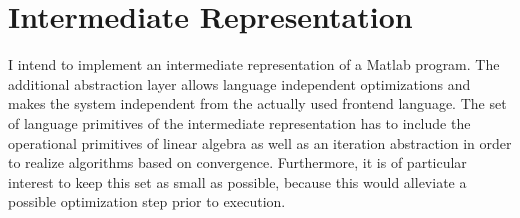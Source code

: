 \section{Intermediate Representation}

I intend to implement an intermediate representation of a Matlab program.
The additional abstraction layer allows language independent optimizations and makes the system independent from the actually used frontend language.
The set of language primitives of the intermediate representation has to include the operational primitives of linear algebra as well as an iteration abstraction in order to realize algorithms based on convergence.
Furthermore, it is of particular interest to keep this set as small as possible, because this would alleviate a possible optimization step prior to execution.
